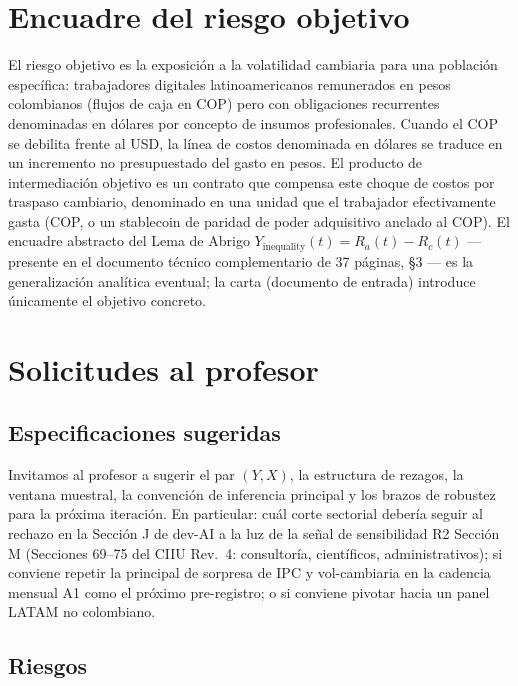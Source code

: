 \documentclass[11pt,a4paper]{article}
\theoremstyle{plain}
\begin{document}
\section{Encuadre del riesgo objetivo}\label{sec:3}

El riesgo objetivo es la exposición a la volatilidad cambiaria para una población específica: trabajadores digitales latinoamericanos remunerados en pesos colombianos (flujos de caja en COP) pero con obligaciones recurrentes denominadas en dólares por concepto de insumos profesionales. Cuando el COP se debilita frente al USD, la línea de costos denominada en dólares se traduce en un incremento no presupuestado del gasto en pesos. El producto de intermediación objetivo es un contrato que compensa este choque de costos por traspaso cambiario, denominado en una unidad que el trabajador efectivamente gasta (COP, o un stablecoin de paridad de poder adquisitivo anclado al COP). El encuadre abstracto del Lema de Abrigo \(Y_{\mathrm{inequality}}(t) = R_a(t) - R_c(t)\) --- presente en el documento técnico complementario de 37 páginas, \S3 --- es la generalización analítica eventual; la carta (documento de entrada) introduce únicamente el objetivo concreto.

\section{Solicitudes al profesor}\label{sec:4}

\subsection{Especificaciones sugeridas}\label{sec:4-specs}

Invitamos al profesor a sugerir el par \((Y, X)\), la estructura de rezagos, la ventana muestral, la convención de inferencia principal y los brazos de robustez para la próxima iteración. En particular: cuál corte sectorial debería seguir al rechazo en la Sección J de dev-AI a la luz de la señal de sensibilidad R2 Sección M (Secciones 69--75 del CIIU Rev.~4: consultoría, científicos, administrativos); si conviene repetir la principal de sorpresa de IPC y vol-cambiaria en la cadencia mensual A1 como el próximo pre-registro; o si conviene pivotar hacia un panel LATAM no colombiano.

\subsection{Riesgos}\label{sec:4-risks}
\end{document}
